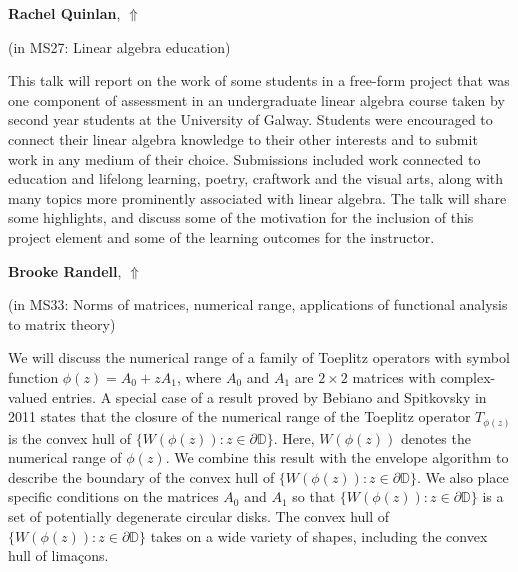 \documentclass[ILAS2025-program.tex]{subfiles}
\begin{document}
     \hypertarget{down0293}{}\begin{ilasabstract}
    
    \textbf{Rachel Quinlan},  \hfill \hyperlink{up0293}{$\Uparrow$}
    
    (in {\color{mstitle}MS27: Linear algebra education})
        
        \mtskip
    This talk will report on the work of some students in a free-form project
that was one component of assessment in an undergraduate linear algebra course taken by second year students at the University of Galway. Students were encouraged to connect their linear algebra knowledge to their other interests and to submit work in any medium of their choice. Submissions included work connected to education and lifelong learning, poetry, craftwork and the visual arts, along with many topics more prominently associated with linear algebra. The talk will share some highlights, and discuss some of the motivation for the inclusion of this project element and some of the learning outcomes for the instructor.

\end{ilasabstract}
     \hypertarget{down0244}{}\begin{ilasabstract}
    
    \textbf{Brooke Randell},  \hfill \hyperlink{up0244}{$\Uparrow$}
    
    (in {\color{mstitle}MS33: Norms of matrices, numerical range, applications of functional analysis to matrix theory})
        
        \mtskip
    We will discuss the numerical range of a family of Toeplitz operators with symbol function \(\phi(z)=A_0+zA_1\), where \(A_0\) and \(A_1\) are \(2 \times 2\) matrices with complex-valued entries. A special case of a result proved by Bebiano and Spitkovsky in 2011 states that the closure of the numerical range of the Toeplitz operator \(T_{\phi(z)}\) is the convex hull of \(\{W(\phi(z)): z \in \partial \mathbb{D}\}\). Here, \(W(\phi(z))\) denotes the numerical range of \(\phi(z)\). We combine this result with the envelope algorithm to describe the boundary of the convex hull of \(\{W(\phi(z)): z \in \partial \mathbb{D}\}\). We also place specific conditions on the matrices \(A_0\) and \(A_1\) so that \(\{W(\phi(z)): z \in \partial \mathbb{D}\}\) is a set of potentially degenerate circular disks. The convex hull of \(\{W(\phi(z)): z \in \partial \mathbb{D}\}\) takes on a wide variety of shapes, including the convex hull of lima\c{c}ons.\end{ilasabstract}
\end{document}
